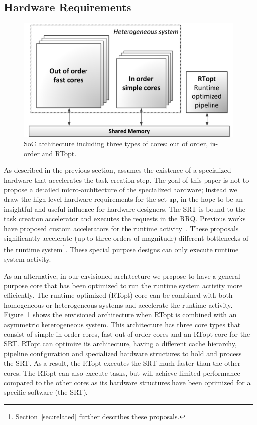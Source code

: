 \subsection{Hardware Requirements}
\label{sec:hw_req}
\begin{figure}[t]%
	\centering
	\includegraphics[width=1.0\columnwidth]{figures/hw_fig.pdf}
	\vspace{-0.5cm}
	\caption{SoC architecture including three types of cores: out of order, in-order and RTopt.}
	\label{fig:hw}%
	\vspace{-0.3cm}
\end{figure}
As described in the previous section, {\proposal} assumes the existence of a specialized hardware that accelerates the task creation step. 
The goal of this paper is not to propose a detailed micro-architecture of the specialized hardware; instead we draw the high-level hardware requirements for the {\proposal} set-up, in the hope to be an insightful and useful influence for hardware designers.
The SRT is bound to the task creation accelerator and executes the requests in the RRQ. 
Previous works have proposed custom accelerators for the runtime activity~\cite{TaskSS, Xubin, Nexus, Swarm, TMU, Carbon}. 
These proposals significantly accelerate (up to three orders of magnitude) different bottlenecks of the runtime system\footnote{Section~\ref{sec:related} further describes these proposals.}. 
These special purpose designs can only execute runtime system activity.

As an alternative, in our envisioned architecture we propose to have a general purpose core that has been optimized to run the runtime system activity more efficiently. 
The runtime optimized (RTopt) core can be combined with both homogeneous or heterogeneous systems and accelerate the runtime activity.
Figure~\ref{fig:hw} shows the envisioned architecture when RTopt is combined with an asymmetric heterogeneous system.
This architecture has three core types that consist of simple in-order cores, fast out-of-order cores and an RTopt core for the SRT. 
RTopt can optimize its architecture, having a different cache hierarchy, pipeline configuration and specialized hardware structures to hold and process the SRT. 
As a result, the RTopt executes the SRT much faster than the other cores. 
The RTopt can also execute tasks, but will achieve limited performance compared to the other cores as its hardware structures have been optimized for a specific software (the SRT).

